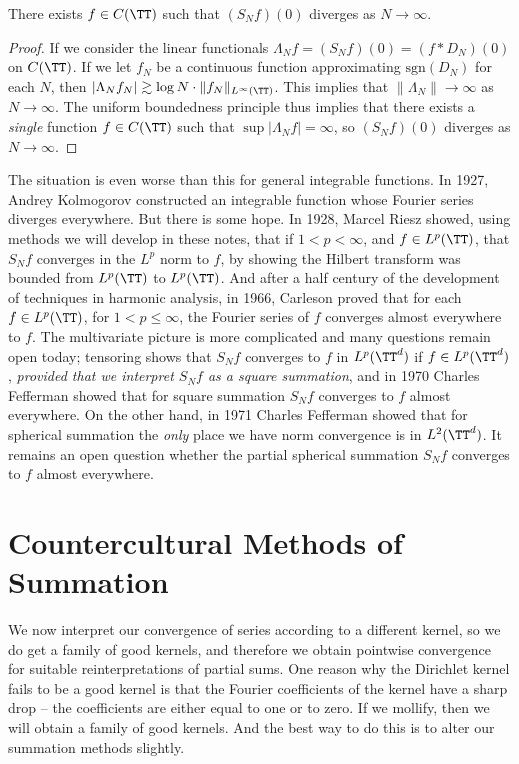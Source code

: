 \begin{theorem}
    There exists $f \in C(\TT)$ such that $(S_N f)(0)$ diverges as $N \to \infty$.
\end{theorem}
\begin{proof}
    If we consider the linear functionals $\Lambda_N f = (S_N f)(0) = (f * D_N)(0)$ on $C(\TT)$. If we let $f_N$ be a continuous function approximating $\text{sgn}(D_N)$ for each $N$, then $|\Lambda_N f_N| \gtrsim \log N \cdot \| f_N \|_{L^\infty(\TT)}$. This implies that $\| \Lambda_N \| \to \infty$ as $N \to \infty$. The uniform boundedness principle thus implies that there exists a {\it single} function $f \in C(\TT)$ such that $\sup |\Lambda_N f| = \infty$, so $(S_N f)(0)$ diverges as $N \to \infty$.
\end{proof}

The situation is even worse than this for general integrable functions. In 1927, Andrey Kolmogorov constructed an integrable function whose Fourier series diverges everywhere. But there is some hope. In 1928, Marcel Riesz showed, using methods we will develop in these notes, that if $1 < p < \infty$, and $f \in L^p(\TT)$, that $S_N f$ converges in the $L^p$ norm to $f$, by showing the Hilbert transform was bounded from $L^p(\TT)$ to $L^p(\TT)$. And after a half century of the development of techniques in harmonic analysis, in 1966, Carleson proved that for each $f \in L^p(\TT)$, for $1 < p \leq \infty$, the Fourier series of $f$ converges almost everywhere to $f$. The multivariate picture is more complicated and many questions remain open today; tensoring shows that $S_N f$ converges to $f$ in $L^p(\TT^d)$ if $f \in L^p(\TT^d)$, \emph{provided that we interpret $S_N f$ as a square summation}, and in 1970 Charles Fefferman showed that for square summation $S_N f$ converges to $f$ almost everywhere. On the other hand, in 1971 Charles Fefferman showed that for spherical summation the \emph{only} place we have norm convergence is in $L^2(\TT^d)$. It remains an open question whether the partial spherical summation $S_N f$ converges to $f$ almost everywhere.

\section{Countercultural Methods of Summation}

We now interpret our convergence of series according to a different kernel, so we do get a family of good kernels, and therefore we obtain pointwise convergence for suitable reinterpretations of partial sums. One reason why the Dirichlet kernel fails to be a good kernel is that the Fourier coefficients of the kernel have a sharp drop -- the coefficients are either equal to one or to zero. If we mollify, then we will obtain a family of good kernels. And the best way to do this is to alter our summation methods slightly.

